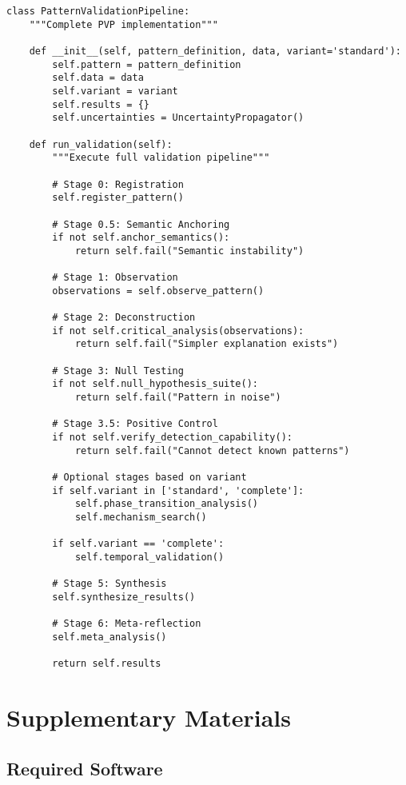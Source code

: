 \documentclass[12pt,oneside]{memoir}
\theoremstyle{plain}
\theoremstyle{definition}
\theoremstyle{remark}
\begin{document}
\begin{lstlisting}[caption={Full PVP Pipeline}]
class PatternValidationPipeline:
    """Complete PVP implementation"""
    
    def __init__(self, pattern_definition, data, variant='standard'):
        self.pattern = pattern_definition
        self.data = data
        self.variant = variant
        self.results = {}
        self.uncertainties = UncertaintyPropagator()
        
    def run_validation(self):
        """Execute full validation pipeline"""
        
        # Stage 0: Registration
        self.register_pattern()
        
        # Stage 0.5: Semantic Anchoring
        if not self.anchor_semantics():
            return self.fail("Semantic instability")
        
        # Stage 1: Observation
        observations = self.observe_pattern()
        
        # Stage 2: Deconstruction
        if not self.critical_analysis(observations):
            return self.fail("Simpler explanation exists")
        
        # Stage 3: Null Testing
        if not self.null_hypothesis_suite():
            return self.fail("Pattern in noise")
        
        # Stage 3.5: Positive Control
        if not self.verify_detection_capability():
            return self.fail("Cannot detect known patterns")
        
        # Optional stages based on variant
        if self.variant in ['standard', 'complete']:
            self.phase_transition_analysis()
            self.mechanism_search()
            
        if self.variant == 'complete':
            self.temporal_validation()
            
        # Stage 5: Synthesis
        self.synthesize_results()
        
        # Stage 6: Meta-reflection
        self.meta_analysis()
        
        return self.results
\end{lstlisting}

\chapter{Supplementary Materials}

\section{Required Software}
\end{document}
